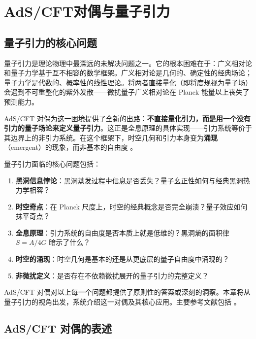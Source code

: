 \chapter{AdS/CFT对偶与量子引力}
\label{chap:AdSCFT}

\section{量子引力的核心问题}

\begin{note}[物理动机]
量子引力是理论物理中最深远的未解决问题之一。它的根本困难在于：广义相对论和量子力学基于互不相容的数学框架。广义相对论是几何的、确定性的经典场论；量子力学是代数的、概率性的线性理论。将两者直接量化（即将度规视为量子场）会遇到不可重整化的紫外发散——微扰量子广义相对论在 Planck 能量以上丧失了预测能力。

AdS/CFT 对偶为这一困境提供了全新的出路：\textbf{不直接量化引力，而是用一个没有引力的量子场论来定义量子引力}。这正是全息原理的具体实现——引力系统等价于其边界上的非引力系统。在这个框架下，时空几何和引力本身变为\textbf{涌现}（emergent）的现象，而非基本的自由度 \cite{Maldacena1997,Witten1998,Maldacena2003}。
\end{note}

量子引力面临的核心问题包括：
\begin{enumerate}
    \item \textbf{黑洞信息悖论}：黑洞蒸发过程中信息是否丢失？量子幺正性如何与经典黑洞热力学相容？
    \item \textbf{时空奇点}：在 Planck 尺度上，时空的经典概念是否完全崩溃？量子效应如何抹平奇点？
    \item \textbf{全息原理}：引力系统的自由度是否本质上就是低维的？黑洞熵的面积律 $S = A/4G$ 暗示了什么？
    \item \textbf{时空的涌现}：时空几何是基本的还是从更底层的量子自由度中涌现的？
    \item \textbf{非微扰定义}：是否存在不依赖微扰展开的量子引力的完整定义？
\end{enumerate}

AdS/CFT 对偶对以上每一个问题都提供了原则性的答案或深刻的洞察。本章将从量子引力的视角出发，系统介绍这一对偶及其核心应用。主要参考文献包括 \cite{Maldacena1997,Witten1998,Gubser1998,Aharony1999,Nastase2007,Maldacena2003,Hubeny2015,Rangamani2016,Erdmenger2018}。

\section{AdS/CFT 对偶的表述}

